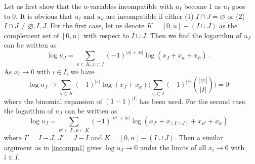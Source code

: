 \documentclass[hidelinks,12pt]{article}
\begin{document}
\begin{enumerate}
Let us first show that the $u$-variables incompatible with $u_{I}$ become 1 as $u_{I}$ goes to 0. It is obvious that $u_{I}$ and $u_{J}$ are incompatible if either (1) $I\cap J=  \varnothing$  or (2) $I\cap J \neq \varnothing,I, J $. For the first case, let us denote $K=[0,n]-(I\cup J)$ as the complement set of $[0,n]$ with respect to $I\cup J$. Then we find the logarithm of $u_{J}$ can be written as 
\begin{equation}
     \log u_{J} = \sum_{\kappa\subset K,\psi\subset I} (-1)^{\lvert\kappa\rvert+\lvert \psi\rvert }\log (x_{J}+x_{ \kappa} +x_{ \psi} )\:. \label{1incompuvarforPn}
\end{equation}
As $x_{i}\to 0$ with $i\in I$, we have 
\begin{equation}
   \log u_{J} \to \sum_{\kappa\subset K} (-1)^{\lvert \kappa\rvert } \log (x_{J}+x_{ \kappa})\Biggl(\sum_{\psi\subset I}(-1)^{\lvert\psi\rvert}\binom{\lvert \psi \rvert }{\lvert I \rvert }\Biggr)=0 \label{incompn1}
\end{equation}
where the binomial expansion of $(1-1)^{\lvert I \rvert}$ has been used. For the second case, the logarithm of $u_{J}$ can be written as 
\begin{equation}
   \log u_{J} = \sum_{\psi'\subset I',\kappa\subset K}(-1)^{\lvert \psi' \rvert+ \lvert \kappa\rvert}  \log (x_{J'}+ x_{(I\cap J)}+x_{ \psi'}+x_{\kappa })
\end{equation}
where $I'=I-J$, $J'=J-I$ and $K=[0,n]-(I\cup J)$. Then a similar argument as in \eqref{incompn1} gives $\log u_{J}\to 0$ under the limits of all $x_{i}\to 0$ with $i\in I$.


\end{enumerate}
\end{document}
